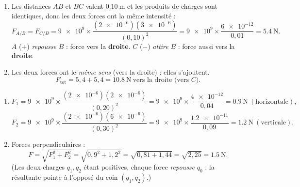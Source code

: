 \documentclass[11pt,a4paper]{article}
\begin{document}
\begin{corrige}
\begin{enumerate}[label=\alph*)]
  \item Les distances $A\!B$ et $B\!C$ valent $\SI{0.10}{\metre}$ et les produits de charges sont
        identiques, donc les deux forces ont la même intensité :
        \[ F_{A/B} = F_{C/B} = \num{9e9}\times\frac{(\num{2e-6})(\num{3e-6})}{(0{,}10)^2}
              = \num{9e9}\times\frac{\num{6e-12}}{0{,}01} = \SI{5.4}{\newton}. \]
        $A$ ($+$) \emph{repousse} $B$ : force vers la \textbf{droite}. $C$ ($-$) \emph{attire} $B$ :
        force aussi vers la \textbf{droite}.
  \item Les deux forces ont le \emph{même sens} (vers la droite) : elles s'ajoutent.
        \[ F_{\text{tot}} = 5{,}4 + 5{,}4 = \SI{10.8}{\newton}\ \text{vers la droite (vers } C). \]
\end{enumerate}
\end{corrige}

\begin{corrige}
\begin{enumerate}[label=\alph*)]
  \item \[ F_1 = \num{9e9}\times\frac{(\num{2e-6})(\num{2e-6})}{(0{,}20)^2}
             = \num{9e9}\times\frac{\num{4e-12}}{0{,}04} = \SI{0.9}{\newton}\ (\text{horizontale}), \]
        \[ F_2 = \num{9e9}\times\frac{(\num{2e-6})(\num{6e-6})}{(0{,}30)^2}
             = \num{9e9}\times\frac{\num{1.2e-11}}{0{,}09} = \SI{1.2}{\newton}\ (\text{verticale}). \]
  \item Forces perpendiculaires :
        \[ F = \sqrt{F_1^2 + F_2^2} = \sqrt{0{,}9^2 + 1{,}2^2} = \sqrt{0{,}81 + 1{,}44}
             = \sqrt{2{,}25} = \SI{1.5}{\newton}. \]
        (Les deux charges $q_1,q_2$ étant positives, chaque force \emph{repousse} $q_0$ : la
        résultante pointe à l'opposé du coin $(q_1,q_2)$.)
\end{enumerate}
\end{corrige}
\end{document}
